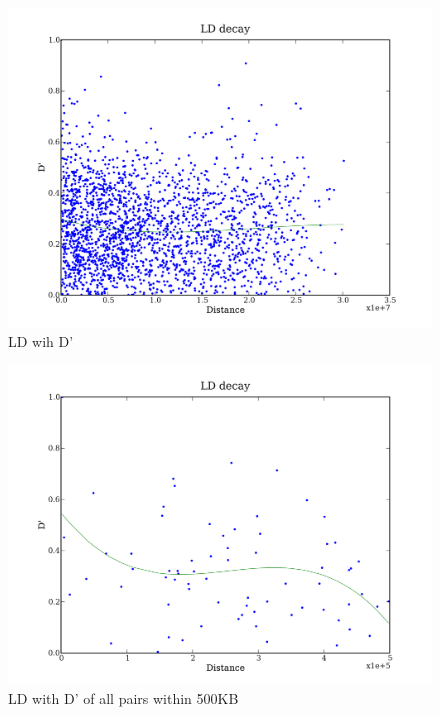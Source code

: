 \documentclass[a4paper,10pt]{article}
\begin{document}
\begin{figure}
\includegraphics[width=1\textwidth]{figures/data_d110_c0_5_LD_D_prime_0.png}
\caption{LD wih D'}\label{fld_9}
\end{figure}


\begin{figure}
\includegraphics[width=1\textwidth]{figures/data_d110_c0_5_LD_D_prime_500000.png}
\caption{LD with D' of all pairs within 500KB}\label{fld_10}
\end{figure}
\end{document}

